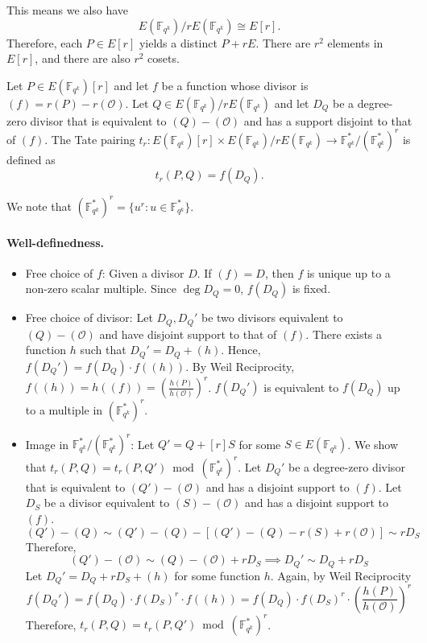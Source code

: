 This means we also have
\[
    E(\mathbb{F}_{q^k}) / rE(\mathbb{F}_{q^k}) \cong E[r].
\]
Therefore, each $P \in E[r]$ yields a distinct $P+rE$. There are $r^2$ elements in $E[r]$, and there are also $r^2$ cosets.

\begin{definition}
Let $P \in E(\mathbb{F}_{q^k})[r]$ and let $f$ be a function whose divisor is $(f) = r(P) - r(\mathcal{O})$.
Let $Q \in E(\mathbb{F}_{q^k}) / rE(\mathbb{F}_{q^k})$ and let $D_Q$ be a degree-zero divisor that is equivalent to $(Q) - (\mathcal{O})$ and has a support disjoint to that of $(f)$.
The Tate pairing $t_r: E(\mathbb{F}_{q^k})[r] \times E(\mathbb{F}_{q^k})/rE(\mathbb{F}_{q^k}) \to \mathbb{F}_{q^k}^* / (\mathbb{F}_{q^k}^*)^r$ is defined as
\[
	t_r(P, Q) = f(D_Q).
\]
\end{definition}

We note that $(\mathbb{F}_{q^k}^*)^r = \{u^r : u \in \mathbb{F}_{q^k}^*\}$.

\paragraph{Well-definedness.}
\begin{itemize}
	\item Free choice of $f$: Given a divisor $D$. If $(f) = D$, then $f$ is unique up to a non-zero scalar multiple. Since $\deg D_Q = 0$, $f(D_Q)$ is fixed.
	\item Free choice of divisor: Let $D_Q, D_Q'$ be two divisors equivalent to $(Q) - (\mathcal{O})$ and have disjoint support to that of $(f)$. There exists a function $h$ such that $D_Q' = D_Q + (h)$. Hence, $f(D_Q') = f(D_Q) \cdot f((h))$. By Weil Reciprocity, $f((h)) = h((f)) = (\frac{h(P)}{h(\mathcal{O})})^r$. $f(D_Q')$ is equivalent to $f(D_Q)$ up to a multiple in $(\mathbb{F}_{q^k}^*)^r$.
	\item Image in $\mathbb{F}_{q^k}^* / (\mathbb{F}_{q^k}^*)^r$: Let $Q' = Q + [r]S$ for some $S \in E(\mathbb{F}_{q^k})$. We show that $t_r(P, Q) = t_r(P, Q') \bmod (\mathbb{F}_{q^k}^*)^r$.
    Let $D_Q'$ be a degree-zero divisor that is equivalent to $(Q') - (\mathcal{O})$ and has a disjoint support to $(f)$. Let $D_S$ be a divisor equivalent to $(S) - (\mathcal{O})$ and has a disjoint support to $(f)$.
	\[
        (Q') - (Q) \sim (Q') - (Q) - [(Q') - (Q) - r(S) + r (\mathcal{O})] \sim rD_S
    \]
    Therefore,
    \[
        (Q') - (\mathcal{O}) \sim (Q) - (\mathcal{O}) + rD_S \implies D_{Q}' \sim D_{Q} + rD_S
	\]
    Let $D_Q' = D_Q + rD_S + (h)$ for some function $h$. Again, by Weil Reciprocity
    \[
        f(D_Q') = f(D_Q) \cdot f(D_S)^r \cdot f((h)) = f(D_Q) \cdot f(D_S)^r \cdot \left(\frac{h(P)}{h(\mathcal{O})}\right)^r
	\]
    Therefore, $t_r(P, Q) = t_r(P, Q') \bmod (\mathbb{F}_{q^k}^*)^r$.
\end{itemize}
    
